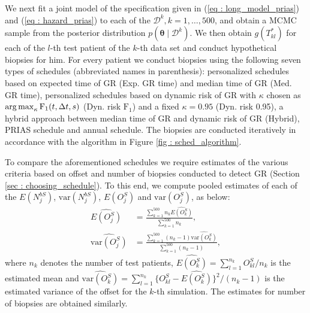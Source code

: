We next fit a joint model of the specification given in (\ref{eq : long_model_prias}) and (\ref{eq : hazard_prias}) to each of the $\mathcal{D}^k, k=1, \ldots, 500$, and obtain a MCMC sample from the posterior distribution $p(\boldsymbol{\theta} \mid \mathcal{D}^k)$. We then obtain $g(T^*_{kl})$ for each of the $l$-th test patient of the $k$-th data set and conduct hypothetical biopsies for him. For every patient we conduct biopsies using the following seven types of schedules (abbreviated names in parenthesis): personalized schedules based on expected time of GR (Exp. GR time) and median time of GR (Med. GR time), personalized schedules based on dynamic risk of GR with $\kappa$ chosen as $\operatorname{arg\,max}_{\kappa} \mbox{F}_1(t, \Delta t, s)$ (Dyn. risk $\mbox{F}_1$) and a fixed $\kappa = 0.95$ (Dyn. risk 0.95), a hybrid approach between median time of GR and dynamic risk of GR (Hybrid), PRIAS schedule and annual schedule. The biopsies are conducted iteratively in accordance with the algorithm in Figure \ref{fig : sched_algorithm}. 

To compare the aforementioned schedules we require estimates of the various criteria based on offset and number of biopsies conducted to detect GR (Section \ref{sec : choosing_schedule}). To this end, we compute pooled estimates of each of the $E(N^{bS}_j)$, $\mbox{var}(N^{bS}_j)$, $E(O^S_j)$ and $\mbox{var}(O^S_j)$, as below:
\begin{align*}
\widehat{E(O^S_j)} &= \frac{\sum_{k=1}^{500} n_k \widehat{E(O^S_k)}}{\sum_{k=1}^{500} n_k}, \\
\widehat{\mbox{var}(O^S_j)} &= \frac{\sum_{k=1}^{500} (n_k - 1) \widehat{\mbox{var}(O^S_k)}}{\sum_{k=1}^{500} (n_k-1)}, 
\end{align*}
where $n_k$ denotes the number of test patients, $\widehat{E(O^S_k)} = {\sum_{l=1}^{n_k}O^S_{kl}}/{n_k}$ is the estimated mean and $\widehat{\mbox{var}(O^S_k)} = {\sum_{l=1}^{n_k}\big\{O^S_{kl} - \widehat{E(O^S_k)}\big\}^2}/(n_k-1)$ is the estimated variance of the offset for the $k$-th simulation. The estimates for number of biopsies are obtained similarly.

